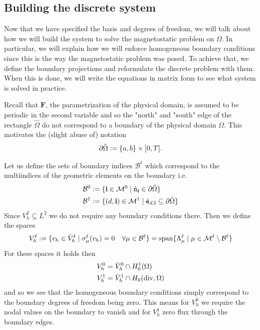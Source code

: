 \documentclass[../master_thesis.tex]{subfiles}
\begin{document}
\subsection{Building the discrete system}\label{sec:assembling_the_discrete_system}

Now that we have specified the basis and degrees of freedom, we will talk about 
how we will build the system to solve the magnetostatic problem on $\Omega$. 
In particular, we will explain how we will enforce homogeneous boundary conditions since 
this is the way the magnetostatic problem was posed. To achieve that, we 
define the boundary projections and reformulate the discrete problem with them.
When this is done, we will write the equations in matrix form to see 
what system is solved in practice. 

Recall that $\mathbf{F}$, the parametrization of the physical domain, is assumed to 
be periodic in the second variable and so the "north" and "south" edge of the 
rectangle $\hat{\Omega}$ do not correspond to a boundary of the physical domain 
$\Omega$. This motivates the 
(slight abuse of) notation 
\begin{align*}
    \partial \hat{\Omega} \vcentcolon= \{a,b\} \times [0,T].
\end{align*}

Let us define the sets of boundary indices $\mathcal{B}^\ell$ which correspond 
to the multiindices of the geometric elements on the boundary i.e. 
\begin{align*}
    \mathcal{B}^0 &\vcentcolon= \{ \mathbf{i} \in \mathcal{M}^0 
        \mid \hat{\mathtt{n}}_\mathbf{i} \in \partial \hat{\Omega} \}
    \\ \mathcal{B}^1 &\vcentcolon= \{ (d,\mathbf{i}) \in \mathcal{M}^1 
        \mid \hat{\mathtt{e}}_{d,\mathbf{i}} \subseteq \partial \hat{\Omega} \}
\end{align*}
Since $V_h^2 \subseteq L^2$ we do not require any boundary conditions there.
Then we define the spaces 
\begin{align*}
    V_h^\ell \vcentcolon= \{ v_h \in \bar{V}_h^\ell \mid \sigma^\ell_\mu (v_h) = 0 
        \quad \forall \mu \in \mathcal{B}^\ell \}
    = \operatorname{span} \{ \Lambda^\ell_\mu \mid \mu \in \mathcal{M}^\ell \setminus \mathcal{B}^\ell \}
\end{align*}
For these spaces it holds then
\begin{align*}
    V_h^0 &= \bar{V}_h^0 \cap H^1_0(\Omega)
    \\ V_h^1 &= \bar{V}_h^1 \cap H_0(\operatorname{div},\Omega)
\end{align*}
and so we see that the homogeneous boundary conditions simply correspond to the 
boundary degrees of freedom being zero. This means for $V_h^0$ we require the 
nodal values on the boundary to vanish and for $V_h^1$ zero flux through the boundary edges.
\end{document}
